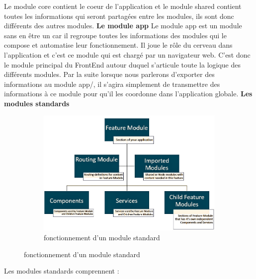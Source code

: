 \documentclass{article}
\begin{document}
Le module core contient le coeur de l'application et le module shared contient toutes les informations qui seront partagées entre les modules, ils sont donc différents des autres modules.
\newpage
\textbf{Le module app}
\newline
\newline
Le module app est un module sans en être un car il regroupe toutes les informations des modules qui le compose et automatise leur fonctionnement.
Il joue le rôle du cerveau dans l'application et c'est ce module qui est chargé par un navigateur web. C'est donc le module principal du FrontEnd autour duquel s'articule toute la logique des différents modules.
Par la suite lorsque nous parlerons d'exporter des informations au module app/, il s'agira simplement de transmettre des informations à ce module pour qu'il les coordonne dans l'application globale.
\newline
\newline
\textbf{Les modules standards}
\newline
\begin{figure}[h!]
	\centering
  	\begin{subfigure}[b]{1.0\linewidth}
	\includegraphics[width=\linewidth]{ang.jpeg}
	\caption{fonctionnement d'un module standard}
  	\end{subfigure}
\end{figure}
\newline
Les modules standards comprennent :
\end{document}
